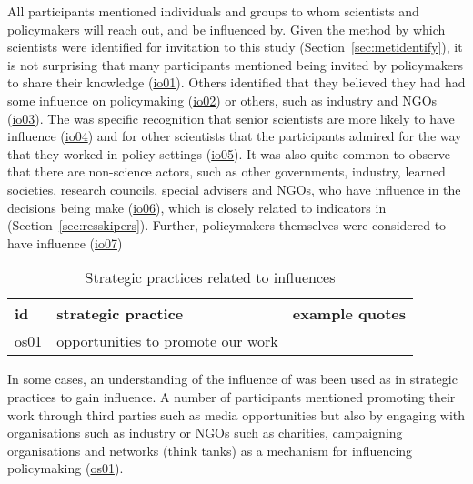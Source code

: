 All participants mentioned individuals and groups to whom scientists and policymakers will reach out, and be influenced by. Given the method by which scientists were identified for invitation to this study (Section~\ref{sec:metidentify}), it is not surprising that many participants mentioned being invited by policymakers to share their knowledge (\hyperref[tab:resskiopin]{io01}). Others identified that they believed they had had some influence on policymaking (\hyperref[tab:resskiopin]{io02}) or others, such as industry and NGOs (\hyperref[tab:resskiopin]{io03}). The was specific recognition that senior scientists are more likely to have influence (\hyperref[tab:resskiopin]{io04}) and for other scientists that the participants admired for the way that they worked in policy settings (\hyperref[tab:resskiopin]{io05}). It was also quite common to observe that there are non-science actors, such as other governments, industry, learned societies, research councils, special advisers and NGOs, who have influence in the decisions being make (\hyperref[tab:resskiopin]{io06}), which is closely related to indicators in \skipers{} (Section~\ref{sec:resskipers}). Further, policymakers themselves were considered to have influence (\hyperref[tab:resskiopin]{io07})

\begin{table}[!ht]
\footnotesize
\caption{Strategic practices related to \skiopin{} influences}\label{tab:resskiopinstrat}
\begin{tabular}{L{.06\linewidth}L{.3\linewidth}L{.64\linewidth}} \hline
\textbf{id} & \textbf{strategic practice} & \textbf{example quotes} \\ \hline \hline
os01 & opportunities to promote our work &  \\[5mm]
\hline
 \end{tabular}
\end{table}

In some cases, an understanding of the influence of \skiopin{} was been used as in strategic practices to gain influence. A number of participants mentioned promoting their work through third parties such as media opportunities but also by engaging with organisations such as industry or NGOs such as charities, campaigning organisations and networks (think tanks) as a mechanism for influencing policymaking (\hyperref[tab:resskiopinstrat]{os01}).

\subsection{\titnetw}\label{sec:resskinetw}

